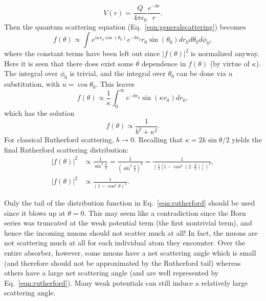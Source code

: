 \begin{equation} \nonumber
V(r)=\frac{Q}{4\pi\epsilon_0}\frac{e^{-br}}{r}.
\end{equation}
Then the quantum scattering equation (Eq.~\eqref{eqn:generalscattering}) becomes
%
\begin{equation} \nonumber
f(\theta)\propto \int e^{i\kappa r_0\cos(\theta_0)}e^{-br_0}r_0\sin(\theta_0)dr_0 d\theta_0 d\phi_0,
\end{equation}
where the constant terms have been left out since $|f(\theta)|^2$ is normalized anyway. Here it is seen that there does exist some $\theta$ dependence in $f(\theta)$ (by virtue of $\kappa$). The integral over $\phi_0$ is trivial, and the integral over $\theta_0$ can be done via $u$ substitution, with $u=\cos\theta_0$. This leaves
\begin{equation} \nonumber
f(\theta)\propto \frac{1}{\kappa}\int_0^\infty e^{-br_0}\sin(\kappa r_0) dr_0,
\end{equation}
%
which has the solution
\begin{equation}\nonumber
f(\theta)\propto\frac{1}{b^2+\kappa^2}.
\end{equation}
For classical Rutherford scattering, $b\rightarrow 0$. Recalling that $\kappa=2k\sin{\theta/2}$ yields the final Rutherford scattering distribution:
\begin{align}
|f(\theta)|^2 &\propto \frac{1}{\sin^4 \frac{\theta}{2}}=\frac{1}{\left(\sin^2 \frac{\theta}{2}\right)^2}=\frac{1}{\left(\frac{1}{2}\left[1-\cos^2\left(2\cdot\frac{\theta}{2}\right)\right]\right)^2},\nonumber \\
|f(\theta)|^2  &\propto\frac{1}{(1-\cos^2{\theta})^2}. \label{eqn:rutherford}
\end{align}

Only the tail of the distribution function in Eq.~\eqref{eqn:rutherford} should be used since it blows up at $\theta=0$. This may seem like a contradiction since the Born series was truncated at the weak potential term (the first nontrivial term), and hence the incoming muons should not scatter much at all! In fact, the muons are not scattering much at all for each individual atom they encounter. Over the entire absorber, however, some muons have a net scattering angle which is small (and therefore should not be approximated by the Rutherford tail) whereas others have a large net scattering angle (and are well represented by Eq.~\eqref{eqn:rutherford}). Many weak potentials can still induce a relatively large scattering angle.
